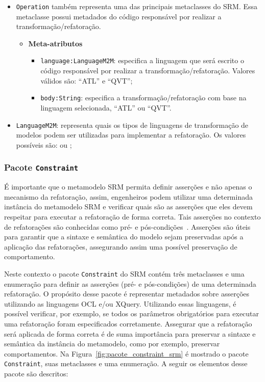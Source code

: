 \begin{itemize}
    \item \texttt{Operation} também representa uma das principais metaclasses do SRM. Essa metaclasse possui metadados do código responsável por realizar a transformação/refatoração.

\begin{itemize}
	\item \textbf{Meta-atributos}
		\begin{itemize}
			\item \texttt{language:LanguageM2M}: especifica a linguagem que será escrito o código responsável por realizar a transformação/refatoração. Valores válidos são: ``ATL'' e ``QVT'';
			\item \texttt{body:String}: especifica a transformação/refatoração com base na linguagem selecionada, ``ATL'' ou ``QVT''.
		\end{itemize}	
\end{itemize}
     
     \item \texttt{LanguageM2M}: representa quais os tipos de linguagens de transformação de modelos podem ser utilizadas para implementar a refatoração. Os valores possíveis são:  ou ;
     
\end{itemize}

\subsubsection{Pacote \texttt{Constraint}}

É importante que o metamodelo SRM permita definir asserções e não apenas o mecanismo da refatoração, assim, engenheiros podem utilizar uma determinada instância do metamodelo SRM e verificar quais são as asserções que eles devem respeitar para executar a refatoração de forma correta. Tais asserções no contexto de refatorações são conhecidas como pré- e pós-condições~\cite{OPDYKE_1992, Roberts_1999}. Asserções são úteis para garantir que a sintaxe e semântica do modelo sejam preservadas após a aplicação das refatorações, assegurando assim uma possível preservação de comportamento.

Neste contexto o pacote \texttt{Constraint} do SRM contém três metaclasses e uma enumeração para definir as asserções (pré- e pós-condições) de uma determinada refatoração. O propósito desse pacote é representar metadados sobre asserções utilizando as linguagens OCL e/ou XQuery. Utilizando essas linguagens, é possível verificar, por exemplo, se todos os parâmetros obrigatórios para executar uma refatoração foram especificados corretamente. Assegurar que a refatoração será aplicada de forma correta é de suma importância para preservar a sintaxe e semântica da instância do metamodelo, como por exemplo, preservar comportamentos. Na Figura~\ref{fig:pacote_constraint_srm} é mostrado o pacote \texttt{Constraint}, suas metaclasses e uma enumeração. A seguir os elementos desse pacote são descritos:

